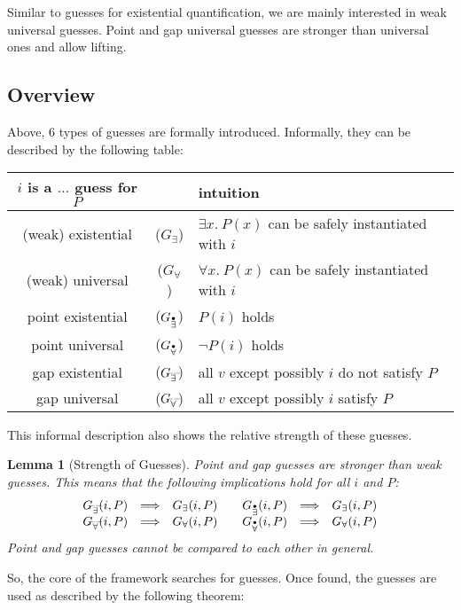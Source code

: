 \documentclass[a4paper,12pt,DIV=12,oneside]{scrbook}
\newtheorem{lemma}{Lemma}[section]
\theoremstyle{definition}
\theoremstyle{remark}
\newcommand{\GE}{\ensuremath{G_\exists}}
\newcommand{\GEP}{\ensuremath{G_{\accentset{\bullet}{\exists}}}}
\newcommand{\GEG}{\ensuremath{G_{\accentset{\_\,\_}{\exists}}}}
\newcommand{\GU}{\ensuremath{G_\forall}}
\newcommand{\GUP}{\ensuremath{G_{\accentset{\bullet}{\forall}}}}
\newcommand{\GUG}{\ensuremath{G_{\accentset{\_\,\_}{\forall}}}}
\begin{document}
Similar to guesses for existential quantification, we are mainly interested in weak universal guesses. Point and gap
universal guesses are stronger than universal ones and allow lifting.


\subsection{Overview}

Above, 6 types of guesses are formally introduced. Informally, they can be described by the following table:
%
\begin{center}
\begin{tabular}{cc@{\quad}|@{\quad}l}
\textbf{$i$ is a $\ldots$ guess for $P$} &  & \textbf{intuition} \\\hline
(weak) existential & ($\GE$) & $\exists x.\ P(x)$ can be safely instantiated with $i$ \\
(weak) universal & ($\GU$) & $\forall x.\ P(x)$ can be safely instantiated with $i$ \\
point existential & ($\GEP$) & $P(i)$ holds \\
point universal & ($\GUP$) & $\neg P(i)$ holds \\
gap existential & ($\GEG$) & all $v$ except possibly $i$ do not satisfy $P$\\
gap universal & ($\GUG$) & all $v$ except possibly $i$ satisfy $P$\\
\end{tabular}
\end{center}
%
This informal description also shows the relative strength of these guesses.
%
\begin{lemma}[Strength of Guesses]\label{lemma_guesses_strength}%
Point and gap guesses are stronger than weak guesses. This means that the following
implications hold for all $i$ and $P$:
\[
\begin{array}{rcl@{\qquad}rcl}
  \GEG(i, P) & \Longrightarrow & \GE(i, P) &
  \GEP(i, P) & \Longrightarrow & \GE(i, P) \\
  \GUG(i, P) & \Longrightarrow & \GU(i, P) &
  \GUP(i, P) & \Longrightarrow & \GU(i, P)
\end{array}
\]
\noindent
Point and gap guesses cannot be compared to each other in general.
\end{lemma}

So, the core of the framework searches for guesses. Once found, the guesses are used as described by the following theorem:
\end{document}
